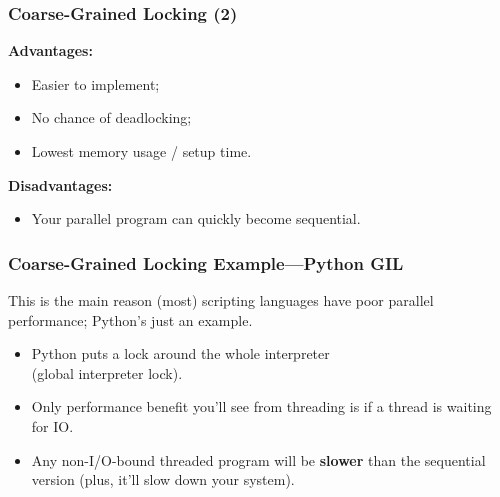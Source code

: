 \begin{frame}
  \frametitle{Coarse-Grained Locking (2)}

  
  {\bf Advantages:}
  
  \begin{itemize}
    \item Easier to implement;
    \item No chance of deadlocking;
    \item Lowest memory usage / setup time.
  \end{itemize}
  \vfill
  {\bf Disadvantages:}
  \begin{itemize}
    \item Your parallel program can quickly become sequential.
  \end{itemize}
  
\end{frame}

\begin{frame}
  \frametitle{Coarse-Grained Locking Example---Python GIL}

  
  This is the main reason (most) scripting languages have poor parallel
  performance; Python's just an example.

  \begin{itemize}
    \item Python puts a lock around the whole interpreter\\ \quad (global interpreter lock).

    \item Only performance benefit you'll see from threading is if a thread is
      waiting for IO.

    \item Any non-I/O-bound threaded program will be {\bf slower} than the sequential
      version (plus, it'll slow down your system).
  \end{itemize}
  
\end{frame}

